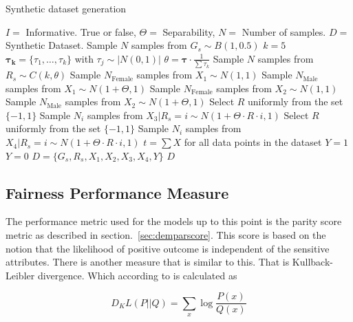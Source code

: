 \begin{algorithm}
    \caption{Synthetic dataset generation}
    \begin{algorithmic}
        \REQUIRE $I = $ Informative. True or false, $\Theta = $ Separability, $N =$ Number of samples.
        \ENSURE $D = $ Synthetic Dataset.
        \STATE Sample $N$ samples from $G_s \sim B(1, 0.5)$
        \STATE $k = 5$
        \STATE $\boldsymbol{\tau_k} = \{ \tau_1, \dots, \tau_k \}$ with $\tau_j \sim |N(0, 1)|$
        \STATE $\theta = \boldsymbol{\tau} \cdot \frac{1}{\sum \tau_k}$
        \STATE Sample $N$ samples from $R_s \sim C(k, \theta)$
        \STATE Sample $N_{\text{Female}}$ samples from $X_1 \sim N(1, 1)$
        \STATE Sample $N_{\text{Male}}$ samples from $X_1 \sim N(1 + \Theta, 1)$
        \STATE Sample $N_{\text{Female}}$ samples from $X_2 \sim N(1, 1)$
        \STATE Sample $N_{\text{Male}}$ samples from $X_2 \sim N(1 + \Theta, 1)$
        \STATE Select $R$ uniformly from the set $\{ -1, 1\}$
        \STATE Sample $N_i$ samples from $X_3 | R_s = i \sim N(1 + \Theta \cdot R \cdot i, 1)$
        \STATE Select $R$ uniformly from the set $\{ -1, 1\}$
        \STATE Sample $N_i$ samples from $X_4 | R_s = i \sim N(1 + \Theta \cdot R \cdot i, 1)$
        \ENDFOR
        \STATE $t = \sum X$ for all data points in the dataset
        \STATE $Y = 1$
        \ELSE
        \STATE $Y = 0$
        \ENDIF
        \STATE $D = \{G_s, R_s, X_1, X_2, X_3, X_4, Y \}$
        \RETURN $D$
    \end{algorithmic}
    \label{alg:datasetgen}
\end{algorithm}

\subsection{Fairness Performance Measure}

The performance metric used for the models up to this point is the parity score metric as described in section.~\ref{sec:demparscore}. This score is based on the notion that the likelihood of positive outcome is independent of the sensitive attributes. There is another measure that is similar to this. That is Kullback-Leibler divergence. Which according to \citet{Mackay:2003:information} is calculated as 

\begin{equation*}
    D_KL(P ||Q) = \sum_x \log\frac{P(x)}{Q(x)}
\end{equation*}

